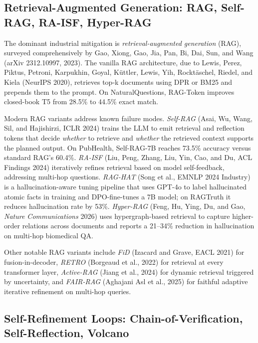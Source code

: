 \subsection{Retrieval-Augmented Generation: RAG, Self-RAG, RA-ISF, Hyper-RAG}\label{retrieval-augmented-generation-rag-self-rag-ra-isf-hyper-rag}

The dominant industrial mitigation is \emph{retrieval-augmented generation} (RAG), surveyed comprehensively by Gao, Xiong, Gao, Jia, Pan, Bi, Dai, Sun, and Wang (arXiv 2312.10997, 2023). The vanilla RAG architecture, due to Lewis, Perez, Piktus, Petroni, Karpukhin, Goyal, Küttler, Lewis, Yih, Rocktäschel, Riedel, and Kiela (NeurIPS 2020), retrieves top-k documents using DPR or BM25 and prepends them to the prompt. On NaturalQuestions, RAG-Token improves closed-book T5 from 28.5\% to 44.5\% exact match.

Modern RAG variants address known failure modes. \emph{Self-RAG} (Asai, Wu, Wang, Sil, and Hajishirzi, ICLR 2024) trains the LLM to emit retrieval and reflection tokens that decide \emph{whether} to retrieve and \emph{whether} the retrieved context supports the planned output. On PubHealth, Self-RAG-7B reaches 73.5\% accuracy versus standard RAG's 60.4\%. \emph{RA-ISF} (Liu, Peng, Zhang, Liu, Yin, Cao, and Du, ACL Findings 2024) iteratively refines retrieval based on model self-feedback, addressing multi-hop questions. \emph{RAG-HAT} (Song et al., EMNLP 2024 Industry) is a hallucination-aware tuning pipeline that uses GPT-4o to label hallucinated atomic facts in training and DPO-fine-tunes a 7B model; on RAGTruth it reduces hallucination rate by 53\%. \emph{Hyper-RAG} (Feng, Hu, Ying, Du, and Gao, \emph{Nature Communications} 2026) uses hypergraph-based retrieval to capture higher-order relations across documents and reports a 21--34\% reduction in hallucination on multi-hop biomedical QA.

Other notable RAG variants include \emph{FiD} (Izacard and Grave, EACL 2021) for fusion-in-decoder, \emph{RETRO} (Borgeaud et al., 2022) for retrieval at every transformer layer, \emph{Active-RAG} (Jiang et al., 2024) for dynamic retrieval triggered by uncertainty, and \emph{FAIR-RAG} (Aghajani Asl et al., 2025) for faithful adaptive iterative refinement on multi-hop queries.

\subsection{Self-Refinement Loops: Chain-of-Verification, Self-Reflection, Volcano}\label{self-refinement-loops-chain-of-verification-self-reflection-volcano}

